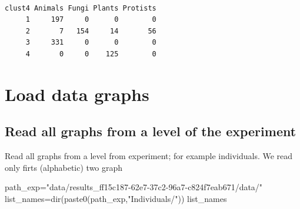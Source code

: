 \documentclass[
  letterpaper,
  DIV=11,
  numbers=noendperiod]{scrreprt}
\newenvironment{Shaded}{\begin{snugshade}}{\end{snugshade}}
\newcommand{\FunctionTok}[1]{\textcolor[rgb]{0.28,0.35,0.67}{#1}}
\newcommand{\NormalTok}[1]{\textcolor[rgb]{0.00,0.23,0.31}{#1}}
\newcommand{\OtherTok}[1]{\textcolor[rgb]{0.00,0.23,0.31}{#1}}
\newcommand{\StringTok}[1]{\textcolor[rgb]{0.13,0.47,0.30}{#1}}
\begin{document}
\begin{verbatim}
      
clust4 Animals Fungi Plants Protists
     1     197     0      0        0
     2       7   154     14       56
     3     331     0      0        0
     4       0     0    125        0
\end{verbatim}


\hypertarget{load-data-graphs}{%
\chapter{Load data graphs}\label{load-data-graphs}}

\hypertarget{read-all-graphs-from-a-level-of-the-experiment}{%
\section{Read all graphs from a level of the
experiment}\label{read-all-graphs-from-a-level-of-the-experiment}}

Read all graphs from a level from experiment; for example individuals.
We read only firts (alphabetic) two graph

\begin{Shaded}
\begin{Highlighting}[]
\NormalTok{path\_exp}\OtherTok{=}\StringTok{"data/results\_ff15c187{-}62e7{-}37c2{-}96a7{-}c824f7eab671/data/"}
\NormalTok{list\_names}\OtherTok{=}\FunctionTok{dir}\NormalTok{(}\FunctionTok{paste0}\NormalTok{(path\_exp,}\StringTok{"Individuals/"}\NormalTok{))}
\NormalTok{list\_names}
\end{Highlighting}
\end{Shaded}
\end{document}
